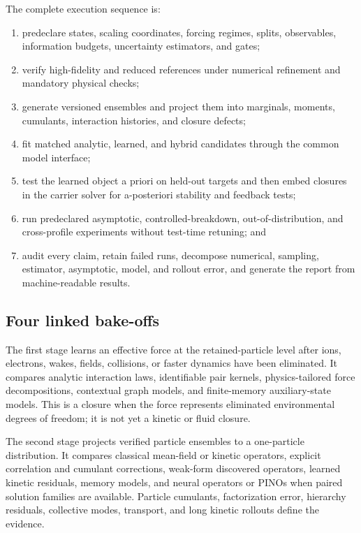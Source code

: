 \documentclass[11pt]{article}
\begin{document}
The complete execution sequence is:
\begin{enumerate}
  \item predeclare states, scaling coordinates, forcing regimes, splits,
    observables, information budgets, uncertainty estimators, and gates;
  \item verify high-fidelity and reduced references under numerical refinement
    and mandatory physical checks;
  \item generate versioned ensembles and project them into marginals, moments,
    cumulants, interaction histories, and closure defects;
  \item fit matched analytic, learned, and hybrid candidates through the common
    model interface;
  \item test the learned object a priori on held-out targets and then embed
    closures in the carrier solver for a-posteriori stability and feedback
    tests;
  \item run predeclared asymptotic, controlled-breakdown,
    out-of-distribution, and cross-profile experiments without test-time
    retuning; and
  \item audit every claim, retain failed runs, decompose numerical, sampling,
    estimator, asymptotic, model, and rollout error, and generate the report
    from machine-readable results.
\end{enumerate}

\subsection{Four linked bake-offs}
The first stage learns an effective force at the retained-particle level after
ions, electrons, wakes, fields, collisions, or faster dynamics have been
eliminated. It compares analytic interaction laws, identifiable pair kernels,
physics-tailored force decompositions, contextual graph models, and
finite-memory auxiliary-state models. This is a closure when the force
represents eliminated environmental degrees of freedom; it is not yet a
kinetic or fluid closure.

The second stage projects verified particle ensembles to a one-particle
distribution. It compares classical mean-field or kinetic operators, explicit
correlation and cumulant corrections, weak-form discovered operators, learned
kinetic residuals, memory models, and neural operators or PINOs when paired
solution families are available. Particle cumulants, factorization error,
hierarchy residuals, collective modes, transport, and long kinetic rollouts
define the evidence.
\end{document}
